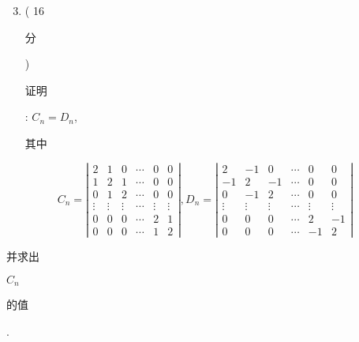 \documentclass[10pt]{article}
\begin{document}
\begin{enumerate}
  \setcounter{enumi}{2}
  \item ( 16 \begin{CJK}{UTF8}{mj}分\end{CJK}) \begin{CJK}{UTF8}{mj}证明\end{CJK}: $C_{n}=D_{n}$, \begin{CJK}{UTF8}{mj}其中\end{CJK}
\end{enumerate}
$$
C_{n}=\left|\begin{array}{cccccc}
2 & 1 & 0 & \cdots & 0 & 0 \\
1 & 2 & 1 & \cdots & 0 & 0 \\
0 & 1 & 2 & \cdots & 0 & 0 \\
\vdots & \vdots & \vdots & \cdots & \vdots & \vdots \\
0 & 0 & 0 & \cdots & 2 & 1 \\
0 & 0 & 0 & \cdots & 1 & 2
\end{array}\right|, D_{n}=\left|\begin{array}{cccccc}
2 & -1 & 0 & \cdots & 0 & 0 \\
-1 & 2 & -1 & \cdots & 0 & 0 \\
0 & -1 & 2 & \cdots & 0 & 0 \\
\vdots & \vdots & \vdots & \cdots & \vdots & \vdots \\
0 & 0 & 0 & \cdots & 2 & -1 \\
0 & 0 & 0 & \cdots & -1 & 2
\end{array}\right|
$$
\begin{CJK}{UTF8}{mj}并求出\end{CJK} $C_{n}$ \begin{CJK}{UTF8}{mj}的值\end{CJK}.
\end{document}
